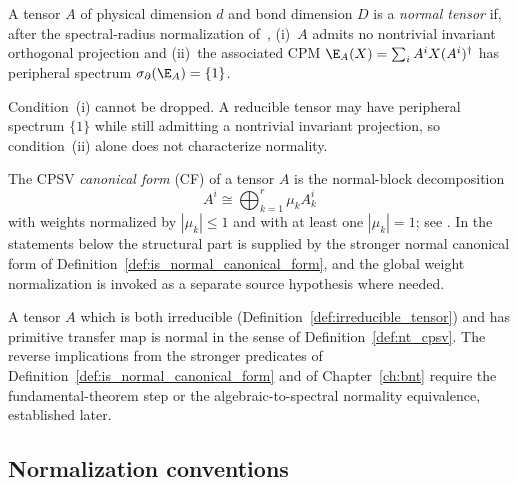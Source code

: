 \begin{definition}\label{def:nt_cpsv}
    \leanok
    A tensor $A$ of physical dimension $d$ and bond dimension $D$ is a
    \emph{normal tensor} if, after the spectral-radius normalization
    of~\cite{Cirac2016MPDO_arXiv}, (i)~$A$ admits no nontrivial invariant
    orthogonal projection and (ii)~the associated CPM
    $\E_A(X) = \sum_i A^i X (A^i)^\dagger$ has peripheral spectrum
    $\sigma_\partial(\E_A)=\{1\}$.
\end{definition}

\begin{remark}
    Condition~(i) cannot be dropped. A reducible tensor may have peripheral
    spectrum $\{1\}$ while still admitting a nontrivial invariant projection, so
    condition~(ii) alone does not characterize normality.
\end{remark}

The CPSV \emph{canonical form} (CF) of a tensor $A$ is the normal-block
decomposition
\[
    A^i \cong \bigoplus_{k=1}^r \mu_k A_k^i
\]
with weights normalized by $|\mu_k| \le 1$ and with at least one $|\mu_k|=1$;
see \cite[Section~2.3]{Cirac2016MPDO_arXiv}. In the statements below the
structural part is supplied by the stronger normal canonical form of
Definition~\ref{def:is_normal_canonical_form}, and the global weight
normalization is invoked as a separate source hypothesis where needed.

\begin{remark}
    A tensor $A$ which is both irreducible
    (Definition~\ref{def:irreducible_tensor}) and has primitive transfer map is
    normal in the sense of Definition~\ref{def:nt_cpsv}. The reverse
    implications from the stronger predicates of
    Definition~\ref{def:is_normal_canonical_form} and of Chapter~\ref{ch:bnt}
    require the fundamental-theorem step or the algebraic-to-spectral normality
    equivalence, established later.
\end{remark}

\subsection{Normalization conventions}\label{sec:transfer_map_normalization}

